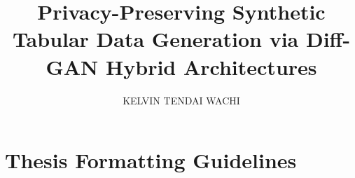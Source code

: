 \documentclass[master,english,professional]{oucthesis}
\title{Privacy-Preserving Synthetic Tabular Data Generation via Diff-GAN Hybrid Architectures}
\author{KELVIN TENDAI WACHI}
\begin{document}
\maketitle

\frontmatter
\tableofcontents
% 

\mainmatter

















\appendix
\chapter{Thesis Formatting Guidelines}

\backmatter

\end{document}
